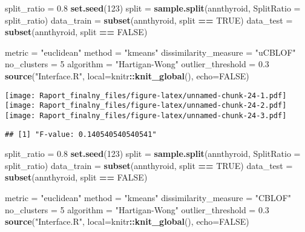 \documentclass[
]{article}
\newenvironment{Shaded}{\begin{snugshade}}{\end{snugshade}}
\newcommand{\DataTypeTok}[1]{\textcolor[rgb]{0.13,0.29,0.53}{#1}}
\newcommand{\DecValTok}[1]{\textcolor[rgb]{0.00,0.00,0.81}{#1}}
\newcommand{\FloatTok}[1]{\textcolor[rgb]{0.00,0.00,0.81}{#1}}
\newcommand{\KeywordTok}[1]{\textcolor[rgb]{0.13,0.29,0.53}{\textbf{#1}}}
\newcommand{\NormalTok}[1]{#1}
\newcommand{\OperatorTok}[1]{\textcolor[rgb]{0.81,0.36,0.00}{\textbf{#1}}}
\newcommand{\OtherTok}[1]{\textcolor[rgb]{0.56,0.35,0.01}{#1}}
\newcommand{\StringTok}[1]{\textcolor[rgb]{0.31,0.60,0.02}{#1}}
\begin{document}
\begin{Shaded}
\begin{Highlighting}[]
\NormalTok{split_ratio =}\StringTok{ }\FloatTok{0.8}
\KeywordTok{set.seed}\NormalTok{(}\DecValTok{123}\NormalTok{)}
\NormalTok{split =}\StringTok{ }\KeywordTok{sample.split}\NormalTok{(annthyroid, }\DataTypeTok{SplitRatio =}\NormalTok{ split_ratio)}
\NormalTok{data_train =}\StringTok{ }\KeywordTok{subset}\NormalTok{(annthyroid, split }\OperatorTok{==}\StringTok{ }\OtherTok{TRUE}\NormalTok{)}
\NormalTok{data_test =}\StringTok{ }\KeywordTok{subset}\NormalTok{(annthyroid, split }\OperatorTok{==}\StringTok{ }\OtherTok{FALSE}\NormalTok{)}

\NormalTok{metric =}\StringTok{ "euclidean"}
\NormalTok{method =}\StringTok{ "kmeans"}
\NormalTok{dissimilarity_measure =}\StringTok{ "uCBLOF"}
\NormalTok{no_clusters =}\StringTok{ }\DecValTok{5}
\NormalTok{algorithm =}\StringTok{ "Hartigan-Wong"}
\NormalTok{outlier_threshold =}\StringTok{ }\FloatTok{0.3}
\KeywordTok{source}\NormalTok{(}\StringTok{"Interface.R"}\NormalTok{, }\DataTypeTok{local=}\NormalTok{knitr}\OperatorTok{::}\KeywordTok{knit_global}\NormalTok{(), }\DataTypeTok{echo=}\OtherTok{FALSE}\NormalTok{)}
\end{Highlighting}
\end{Shaded}

\texttt{[image: Raport\_finalny\_files/figure-latex/unnamed-chunk-24-1.pdf]}
\texttt{[image: Raport\_finalny\_files/figure-latex/unnamed-chunk-24-2.pdf]}
\texttt{[image: Raport\_finalny\_files/figure-latex/unnamed-chunk-24-3.pdf]}

\begin{verbatim}
## [1] "F-value: 0.140540540540541"
\end{verbatim}

\begin{Shaded}
\begin{Highlighting}[]
\NormalTok{split_ratio =}\StringTok{ }\FloatTok{0.8}
\KeywordTok{set.seed}\NormalTok{(}\DecValTok{123}\NormalTok{)}
\NormalTok{split =}\StringTok{ }\KeywordTok{sample.split}\NormalTok{(annthyroid, }\DataTypeTok{SplitRatio =}\NormalTok{ split_ratio)}
\NormalTok{data_train =}\StringTok{ }\KeywordTok{subset}\NormalTok{(annthyroid, split }\OperatorTok{==}\StringTok{ }\OtherTok{TRUE}\NormalTok{)}
\NormalTok{data_test =}\StringTok{ }\KeywordTok{subset}\NormalTok{(annthyroid, split }\OperatorTok{==}\StringTok{ }\OtherTok{FALSE}\NormalTok{)}

\NormalTok{metric =}\StringTok{ "euclidean"}
\NormalTok{method =}\StringTok{ "kmeans"}
\NormalTok{dissimilarity_measure =}\StringTok{ "CBLOF"}
\NormalTok{no_clusters =}\StringTok{ }\DecValTok{5}
\NormalTok{algorithm =}\StringTok{ "Hartigan-Wong"}
\NormalTok{outlier_threshold =}\StringTok{ }\FloatTok{0.3}
\KeywordTok{source}\NormalTok{(}\StringTok{"Interface.R"}\NormalTok{, }\DataTypeTok{local=}\NormalTok{knitr}\OperatorTok{::}\KeywordTok{knit_global}\NormalTok{(), }\DataTypeTok{echo=}\OtherTok{FALSE}\NormalTok{)}
\end{Highlighting}
\end{Shaded}
\end{document}
